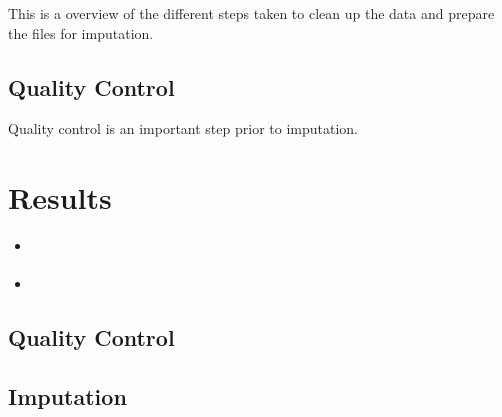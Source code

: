 \documentclass[letterpaper,10pt,english]{sphinxmanual}
\begin{document}
This is a overview of the different steps taken to clean up the data and prepare the files for imputation.


\section{Quality Control}
\label{\detokenize{content/material_methods:quality-control}}
Quality control is an important step prior to imputation.


\chapter{Results}
\label{\detokenize{content/results:results}}\label{\detokenize{content/results::doc}}
\begin{sphinxShadowBox}
\begin{itemize}
\item {} 
\label{\detokenize{content/results:id1}}{\hyperref[\detokenize{content/results:quality-control}]{}}

\item {} 
\label{\detokenize{content/results:id2}}{\hyperref[\detokenize{content/results:imputation}]{}}

\end{itemize}
\end{sphinxShadowBox}


\section{Quality Control}
\label{\detokenize{content/results:quality-control}}

\section{Imputation}
\label{\detokenize{content/results:imputation}}
\end{document}
